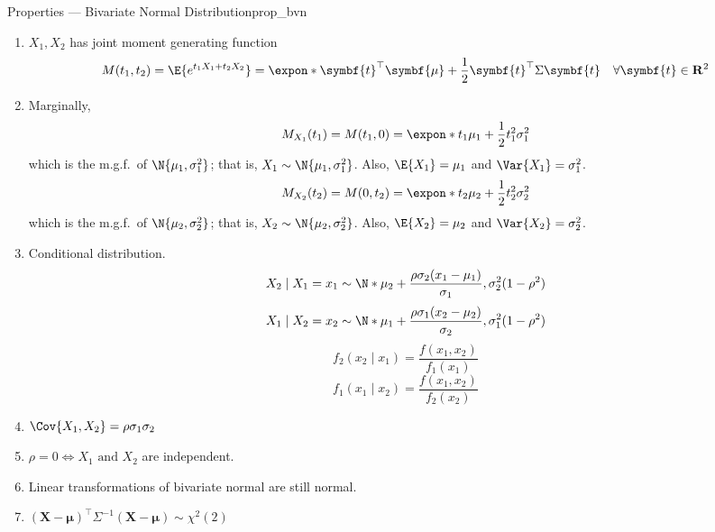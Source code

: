\begin{Proposition}{Properties --- Bivariate Normal Distribution}{prop_bvn}
    \begin{enumerate}[label=(\arabic*)]
        \item\label{prop_bvn_1}$ X_1,X_2 $ has joint moment generating function
              \[ M(t_1,t_2)=\E{
                      e^{t_1X_1+t_2X_2}
                  }=\expon*{\symbf{t}^\top \symbf{\mu}+\frac{1}{2}\symbf{t}^\top \Sigma
                      \symbf{t}}\quad \forall \symbf{t}\in\mathbf{R}^2 \]
        \item\label{prop_bvn_2}Marginally,
              \[ M_{X_1}(t_1)=M(t_1,0)=\expon*{t_1\mu_1+\frac{1}{2} t_1^2
                      \sigma_1^2} \]
              which is the m.g.f.\ of $ \N{\mu_1,\sigma_1^2} $; that is,
              $ X_1 \sim \N{\mu_1,\sigma_1^2} $. Also,
              $ \E{X_1}=\mu_1 $ and $ \Var{X_1}=\sigma_1^2 $.
              \[ M_{X_2}(t_2)=M(0,t_2)=\expon*{t_2\mu_2+\frac{1}{2} t_2^2
                      \sigma_2^2} \]
              which is the m.g.f.\ of $ \N{\mu_2,\sigma_2^2} $; that is,
              $ X_2 \sim \N{\mu_2,\sigma_2^2} $. Also,
              $ \E{X_2}=\mu_2 $ and $ \Var{X_2}=\sigma_2^2 $.
        \item\label{prop_bvn_3}Conditional distribution.
              \[ X_2\mid X_1=x_1 \sim \N*{
                      \mu_2+\frac{\rho\sigma_2(x_1-\mu_1)}{\sigma_1} ,
                      \sigma_2^2(1-\rho^2)} \]
              \[ X_1\mid X_2=x_2 \sim
                  \N*{\mu_1+\frac{\rho\sigma_1(x_2-\mu_2)}{\sigma_2} ,
                      \sigma_1^2(1-\rho^2)} \]
              \[ f_2(x_2\mid x_1)=\frac{f(x_1,x_2)}{f_1(x_1)}  \]
              \[ f_1(x_1\mid x_2)=\frac{f(x_1,x_2)}{f_2(x_2)}  \]
        \item\label{prop_bvn_4}$ \Cov{X_1,X_2}=\rho\sigma_1\sigma_2 $
        \item\label{prop_bvn_5}$ \rho=0\iff X_1\text{ and }X_2 $ are independent.
        \item\label{prop_bvn_6}Linear transformations of bivariate
              normal are still normal.
        \item\label{prop_bvn_7}$ (\symbf{X}-\symbf{\mu})^\top \Sigma^{-1}(\symbf{X}-\symbf{\mu})\sim \chi^2(2) $
    \end{enumerate}
\end{Proposition}
